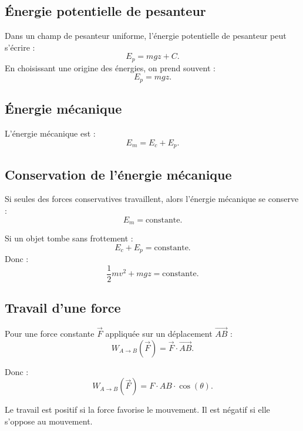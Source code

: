 \documentclass[11pt,a4paper]{article}
\begin{document}
\subsection{Énergie potentielle de pesanteur}

\begin{definition}
Dans un champ de pesanteur uniforme, l'énergie potentielle de pesanteur peut s'écrire :
\[
E_p=mgz+C.
\]
En choisissant une origine des énergies, on prend souvent :
\[
E_p=mgz.
\]
\end{definition}

\subsection{Énergie mécanique}

\begin{definition}
L'énergie mécanique est :
\[
E_m=E_c+E_p.
\]
\end{definition}

\subsection{Conservation de l'énergie mécanique}

\begin{propriete}
Si seules des forces conservatives travaillent, alors l'énergie mécanique se conserve :
\[
E_m=\text{constante}.
\]
\end{propriete}

\begin{exemple}
Si un objet tombe sans frottement :
\[
E_c+E_p=\text{constante}.
\]
Donc :
\[
\frac12mv^2+mgz=\text{constante}.
\]
\end{exemple}

\subsection{Travail d'une force}

\begin{definition}
Pour une force constante $\vec F$ appliquée sur un déplacement $\vec{AB}$ :
\[
W_{A\to B}(\vec F)=\vec F\cdot \vec{AB}.
\]
\end{definition}

Donc :
\[
W_{A\to B}(\vec F)=F\cdot AB\cdot \cos(\theta).
\]

\begin{alerte}
Le travail est positif si la force favorise le mouvement.  
Il est négatif si elle s'oppose au mouvement.
\end{alerte}
\end{document}
